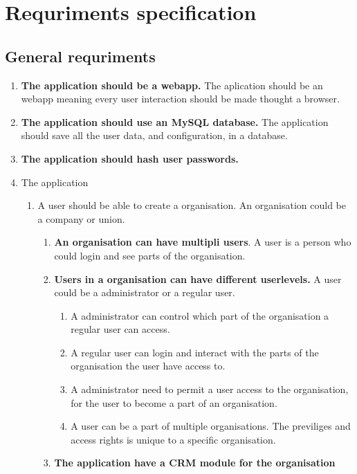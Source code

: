\section{Requriments specification}

\subsection{General requriments}

\begin{enumerate}
    \item \textbf{The application should be a webapp.} The aplication should be an webapp meaning every user interaction should be made thought a browser.
    \item \textbf{The application should use an MySQL database.} The application should save all the user data, and configuration, in a database.
    \item \textbf{The application should hash user passwords.}
    \item The application
    \begin{enumerate}
        \item {A user should be able to create a organisation.} An organisation could be a company or union.
        \begin{enumerate}
            \item \textbf{An organisation can have multipli users}. A user is a person who could login and see parts of the organisation.
            \item \textbf{Users in a organisation can have different userlevels.} A user could be a administrator or a regular user.
            \begin{enumerate}
                \item A administrator can control which part of the organisation a regular user can access.
                \item A regular user can login and interact with the parts of the organisation the user have access to.
                \item A administrator need to permit a user access to the organisation, for the user to become a part of an organisation.
                \item A user can be a part of multiple organisations. The previliges and access rights is unique to a specific organisation.
            \end{enumerate}
            \item \textbf{The application have a CRM module for the organisation}

\end{enumerate}
\end{enumerate}
\end{enumerate}
